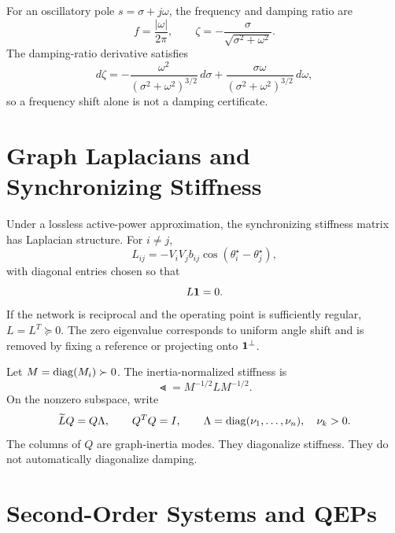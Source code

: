 For an oscillatory pole \(s=\sigma+j\omega\), the frequency and damping ratio
are
\begin{equation}
  f=\frac{|\omega|}{2\pi},\qquad
  \zeta=-\frac{\sigma}{\sqrt{\sigma^2+\omega^2}}.
  \label{eq:prelim_zeta}
\end{equation}
The damping-ratio derivative satisfies
\begin{equation}
  d\zeta
  =
  -\frac{\omega^2}{(\sigma^2+\omega^2)^{3/2}}\,d\sigma
  +
  \frac{\sigma\omega}{(\sigma^2+\omega^2)^{3/2}}\,d\omega,
  \label{eq:prelim_dzeta}
\end{equation}
so a frequency shift alone is not a damping certificate.

\section{Graph Laplacians and Synchronizing Stiffness}

Under a lossless active-power approximation, the synchronizing stiffness matrix
has Laplacian structure. For \(i\ne j\),
\begin{equation}
  L_{ij}=-V_iV_j b_{ij}\cos(\theta_i^\star-\theta_j^\star),
  \label{eq:prelim_lap_offdiag}
\end{equation}
with diagonal entries chosen so that
\begin{equation}
  L\mathbf 1=0.
\end{equation}
If the network is reciprocal and the operating point is sufficiently regular,
\(L=L^T\succeq0\). The zero eigenvalue corresponds to uniform angle shift and
is removed by fixing a reference or projecting onto \(\mathbf 1^\perp\).

Let \(M=\operatorname{diag}(M_i)\succ0\). The inertia-normalized stiffness is
\begin{equation}
  \Lt=M^{-1/2}LM^{-1/2}.
  \label{eq:prelim_ltilde}
\end{equation}
On the nonzero subspace, write
\begin{equation}
  \widetilde L Q=Q\Lambda,\qquad Q^TQ=I,\qquad
  \Lambda=\operatorname{diag}(\nu_1,\ldots,\nu_n),\quad \nu_k>0.
  \label{eq:prelim_graph_modes}
\end{equation}
The columns of \(Q\) are graph-inertia modes. They diagonalize stiffness. They
do not automatically diagonalize damping.

\section{Second-Order Systems and QEPs}

